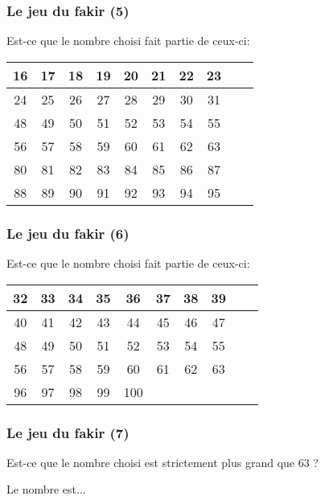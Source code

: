   \begin{frame}[label=fakire]
    \frametitle{Le jeu du fakir (5)}
    Est-ce que le nombre choisi fait partie de ceux-ci:
    \begin{tabular}{|c|c|c|c|c|c|c|c|c|c|}\hline
      16&17&18&19&20&21&22&23\\\hline
      24&25&26&27&28&29&30&31\\\hline
      48&49&50&51&52&53&54&55\\\hline
      56&57&58&59&60&61&62&63\\\hline
      80&81&82&83&84&85&86&87\\\hline
      88&89&90&91&92&93&94&95\\\hline
    \end{tabular}
  \end{frame}
  \begin{frame}[label=fakirf]
    \frametitle{Le jeu du fakir (6)}
    Est-ce que le nombre choisi fait partie de ceux-ci:
    \begin{tabular}{|c|c|c|c|c|c|c|c|c|c|}\hline
      32&33&34&35&36&37&38&39\\\hline
      40&41&42&43&44&45&46&47\\\hline
      48&49&50&51&52&53&54&55\\\hline
      56&57&58&59&60&61&62&63\\\hline
      96&97&98&99&100&&&\\\hline
    \end{tabular}
  \end{frame}
  \begin{frame}[label=fakirg]
    \frametitle{Le jeu du fakir (7)}
    Est-ce que le nombre choisi est strictement plus grand que 63 ?\pause

    {\large Le nombre est...}
    \hyperlink{mesure}{}
  \end{frame}

